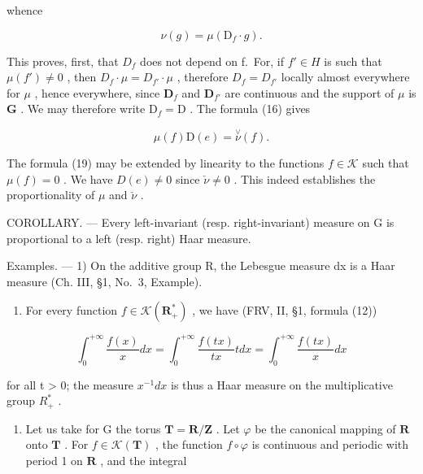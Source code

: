 whence

\[
\nu (g) = \mu (\mathrm{D} _ {f} \cdot g).\tag{18}
\]

This proves, first, that \(D_{f}\) does not depend on f.~For, if \(f' \in H\) is such that \(\mu(f') \neq 0\) , then \(D_{f} \cdot \mu = D_{f'} \cdot \mu\) , therefore \(D_{f} = D_{f'}\) locally almost everywhere for \(\mu\) , hence everywhere, since \(\mathbf{D}_f\) and \(\mathbf{D}_{f'}\) are continuous and the support of \(\mu\) is \(\mathbf{G}\) . We may therefore write \(\mathrm{D}_f = \mathrm{D}\) . The formula (16) gives

\[
\mu (f) \mathrm{D} (e) = \stackrel {\vee} {\nu} (f).\tag{19}
\]

The formula (19) may be extended by linearity to the functions \(f \in \mathcal{K}\) such that \(\mu(f) = 0\) . We have \(D(e) \neq 0\) since \(\check{\nu} \neq 0\) . This indeed establishes the proportionality of \(\mu\) and \(\check{\nu}\) .

COROLLARY. --- Every left-invariant (resp. right-invariant) measure on G is proportional to a left (resp. right) Haar measure.

Examples. --- 1) On the additive group R, the Lebesgue measure dx is a Haar measure (Ch. III, §1, No.~3, Example).

\begin{enumerate}
\def\labelenumi{\arabic{enumi})}
\setcounter{enumi}{1}
\tightlist
\item
  For every function \(f \in \mathcal{K}(\mathbf{R}_+^*)\) , we have (FRV, II, §1, formula (12))
\end{enumerate}

\[
\int_ {0} ^ {+ \infty} \frac {f (x)}{x} d x = \int_ {0} ^ {+ \infty} \frac {f (t x)}{t x} t d x = \int_ {0} ^ {+ \infty} \frac {f (t x)}{x} d x
\]

for all t \textgreater{} 0; the measure \(x^{-1} dx\) is thus a Haar measure on the multiplicative group \(R_{+}^{*}\) .

\begin{enumerate}
\def\labelenumi{\arabic{enumi})}
\setcounter{enumi}{2}
\tightlist
\item
  Let us take for G the torus \(\mathbf{T} = \mathbf{R} / \mathbf{Z}\) . Let \(\varphi\) be the canonical mapping of \(\mathbf{R}\) onto \(\mathbf{T}\) . For \(f \in \mathcal{K}(\mathbf{T})\) , the function \(f \circ \varphi\) is continuous and periodic with period 1 on \(\mathbf{R}\) , and the integral
\end{enumerate}


